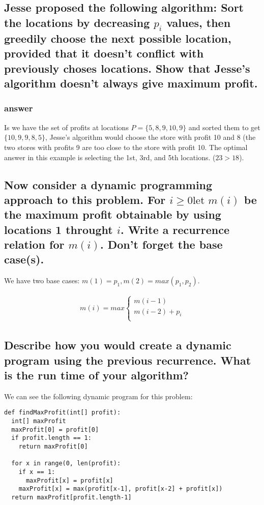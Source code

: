 \documentclass[titlepage]{article}\usepackage[]{graphicx}\usepackage[]{color}
\begin{document}
\subsection{ Jesse proposed the following algorithm: Sort the locations by
  decreasing $p_i$ values, then greedily choose the next possible location,
  provided that it doesn't conflict with previously choses locations. Show that
Jesse's algorithm doesn't always give maximum profit.}

\subsubsection{answer}
Is we have the set of profits at locations $P = \{5, 8, 9, 10, 9\}$ and sorted
them to get $\{10, 9, 9, 8, 5\}$, Jesse's algorithm would choose the store with
profit 10 and 8 (the two stores with profits 9 are too close to the store with
profit 10. The optimal answer in this example is selecting the 1st, 3rd, and
5th locations. ($23 > 18$). 

\subsection{Now consider a dynamic programming approach to this problem. For
  $i\geq 0 \text{let } m(i)$ be the maximum profit obtainable by using
  locations 1 throught $i$. Write a recurrence relation for $m(i)$. Don't
forget the base case(s).}
We have two base cases:
$ m(1) = p_1 , m(2) = max(p_1, p_2)$. 

\begin{align*}
m(i) = max \begin{cases} 
		  m(i-1)  \\
		  m(i-2) + p_i\\
\end{cases}
\end{align*}

\subsection{Describe how you would create a dynamic program using the previous
recurrence. What is the run time of your algorithm?} 

We can see the following dynamic program for this problem:
\begin{lstlisting}
def findMaxProfit(int[] profit):
  int[] maxProfit
  maxProfit[0] = profit[0]
  if profit.length == 1:
	return maxProfit[0]

  for x in range(0, len(profit):
	if x == 1:
	  maxProfit[x] = profit[x]
	maxProfit[x] = max(profit[x-1], profit[x-2] + profit[x])
  return maxProfit[profit.length-1]
\end{lstlisting}
\end{document}
